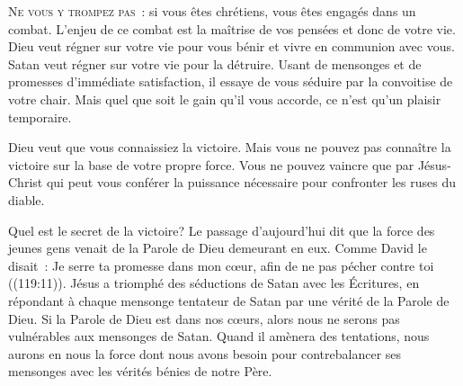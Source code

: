 




\lettrine{N}{e vous y trompez pas~:} si vous êtes chrétiens,
 vous êtes engagés dans un combat. L'enjeu de ce combat est la maîtrise
 de vos pensées et donc de votre vie. Dieu veut régner sur votre vie
 pour vous bénir et vivre en communion avec vous.
 Satan veut régner sur votre vie pour la détruire.
 Usant de mensonges et de promesses d'immédiate satisfaction,
 il essaye de vous séduire par la convoitise de votre chair.
 Mais quel que soit le gain qu'il vous accorde,
 ce n'est qu'un plaisir temporaire.


Dieu veut que vous connaissiez la victoire. Mais vous ne pouvez pas connaître
 la victoire sur la base de votre propre force. Vous ne pouvez vaincre
 que par Jésus-Christ qui peut vous conférer la puissance nécessaire pour
 confronter les ruses du diable.

Quel est le secret de la victoire? Le passage d'aujourd'hui dit que la force
 des jeunes gens venait de la Parole de Dieu demeurant en eux.
 Comme David le disait~: 
 \og Je serre ta promesse dans mon cœur, afin de ne pas pécher contre toi \fg{}
 ((119:11)).
 Jésus a triomphé des séductions de Satan avec les Écritures, en répondant
 à chaque mensonge tentateur de Satan par une vérité de la Parole de Dieu.
 Si la Parole de Dieu est dans nos c\oe{}urs, alors nous ne serons pas
 vulnérables aux mensonges de Satan.
 Quand il amènera des tentations, nous aurons en nous la force dont nous
 avons besoin pour contrebalancer ses mensonges avec les vérités bénies 
 de notre Père.


\dvrule






